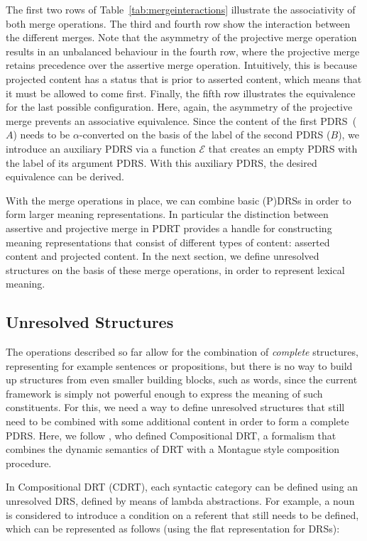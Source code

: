 \noindent The first two rows of Table~\ref{tab:mergeinteractions} illustrate
the associativity of both merge operations. The third and fourth row show
the interaction between the different merges. Note that the asymmetry of the
projective merge operation results in an unbalanced behaviour in the fourth
row, where the projective merge retains precedence over the assertive merge
operation. Intuitively, this is because projected content has a status that
is prior to asserted content, which means that it must be allowed to come
first.  Finally, the fifth row illustrates the equivalence for the last
possible configuration. Here, again, the asymmetry of the projective merge
prevents an associative equivalence. Since the content of the first
PDRS~($A$) needs to be $\alpha$-converted on the basis of the label of the
second PDRS ($B$), we introduce an auxiliary PDRS via a function
$\mathcal{E}$ that creates an empty PDRS with the label of its argument
PDRS. With this auxiliary PDRS, the desired equivalence can be derived.

With the merge operations in place, we can combine basic (P)DRSs in order to
form larger meaning representations. In particular the distinction between
assertive and projective merge in PDRT provides a handle for constructing
meaning representations that consist of different types of content: asserted
content and projected content. In the next section, we define unresolved
structures on the basis of these merge operations, in order to represent
lexical meaning.

\subsection{Unresolved Structures}

The operations described so far allow for the combination of \emph{complete}
structures, representing for example sentences or propositions, but there is
no way to build up structures from even smaller building blocks, such as
words, since the current framework is simply not powerful enough to express
the meaning of such constituents. For this, we need a way to define
unresolved structures that still need to be combined with some additional
content in order to form a complete PDRS.  Here, we follow
, who defined Compositional DRT,
a formalism that combines the dynamic semantics of DRT with a Montague style
composition procedure.

In Compositional DRT (CDRT), each syntactic category can be defined using an
unresolved DRS, defined by means of lambda abstractions. For example, a noun
is considered to introduce a condition on a referent that still needs to be
defined, which can be represented as follows (using the flat representation
for DRSs): 

